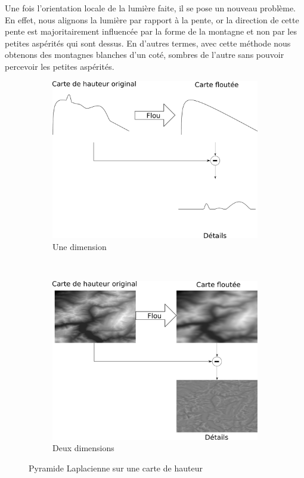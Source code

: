 Une fois l'orientation locale de la lumière faite, il se pose un nouveau problème. En effet, nous alignons la lumière par rapport à la pente, or la direction de cette pente est majoritairement influencée par la forme de la montagne et non par les petites aspérités qui sont dessus. En d'autres termes, avec cette méthode nous obtenons des montagnes blanches d'un coté, sombres de l'autre sans pouvoir percevoir les petites aspérités. 
\begin{figure}[h!]
 \begin{subfigure}[t]{0.47\textwidth}
 \centering
 \includegraphics[width=1.0\linewidth]{Solution/pyramide_Laplace_schema.pdf}
 \caption{Une dimension}
 \end{subfigure}
   ~
 \hspace{.05\textwidth}
  \begin{subfigure}[t]{0.47\textwidth}
 \centering
 \includegraphics[width=1.0\linewidth]{Solution/pyramide_Laplace_image.pdf}
 \caption{Deux dimensions}
 \end{subfigure}
 \caption{\label{fig:pyramide} Pyramide Laplacienne sur une carte de hauteur}
\end{figure}
